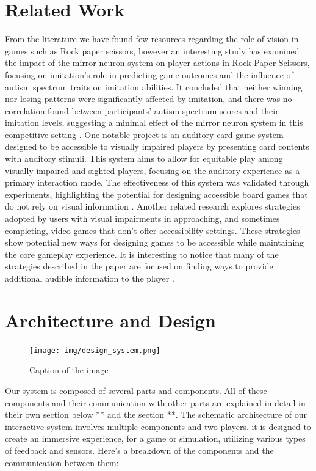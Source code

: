 \documentclass[11pt,a4paper]{report}
\begin{document}
\section*{Related Work}

From the literature we have found few resources regarding the role of vision in games such as Rock paper scissors, however an interesting study has examined the impact of the mirror neuron system on player actions in Rock-Paper-Scissors, focusing on imitation's role in predicting game outcomes and the influence of autism spectrum traits on imitation abilities. It concluded that neither winning nor losing patterns were significantly affected by imitation, and there was no correlation found between participants' autism spectrum scores and their imitation levels, suggesting a minimal effect of the mirror neuron system in this competitive setting \cite*{4}.
One notable project is an auditory card game system designed to be accessible to visually impaired players by presenting card contents with auditory stimuli. This system aims to allow for equitable play among visually impaired and sighted players, focusing on the auditory experience as a primary interaction mode. The effectiveness of this system was validated through experiments, highlighting the potential for designing accessible board games that do not rely on visual information \cite*{3} .
Another related research explores strategies adopted by users with visual impairments in approaching, and sometimes completing, video games that don't offer accessibility settings. These strategies show potential new ways for designing games to be accessible while maintaining the core gameplay experience. It is interesting to notice that many of the strategies described in the paper are focused on finding ways to provide additional audible information to the player \cite*{5}.

\section*{Architecture and Design}
\begin{figure}[htbp]
  \centering
  \texttt{[image: img/design\_system.png]}
  \caption{Caption of the image}
  \label{fig:image_label}
\end{figure}

\noindent Our system is composed of several parts and components.
All of these components and their communication with other parts are explained in detail in their own section below ** add the section **.
The schematic architecture of our interactive system involves multiple components and two players. it is designed to create an immersive experience, for a game or simulation, utilizing various types of feedback and sensors. Here's a breakdown of the components and the communication between them:
\end{document}
